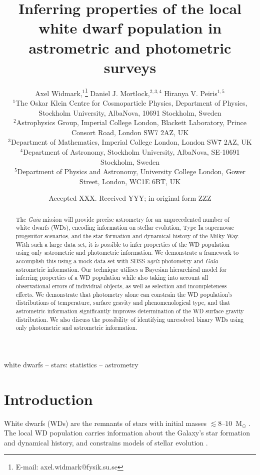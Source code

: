 \documentclass[fleqn,usenatbib]{mnras}
\title[Inferring properties of the white dwarf population]{Inferring properties of the local white dwarf population in astrometric and photometric surveys}
\author[A. Widmark et al.]{
Axel Widmark,$^1$\thanks{E-mail: axel.widmark@fysik.su.se} 
Daniel J. Mortlock,$^{2,3,4}$
Hiranya V. Peiris$^{1,5}$
\\
$^1$The Oskar Klein Centre for Cosmoparticle Physics, Department of
Physics, Stockholm University, AlbaNova, 10691 Stockholm, Sweden\\
$^2$Astrophysics Group, Imperial College London, Blackett Laboratory, Prince Consort Road, London SW7 2AZ, UK\\
$^3$Department of Mathematics, Imperial College London, London SW7 2AZ, UK\\
$^4$Department of Astronomy, Stockholm University, AlbaNova, SE-10691 Stockholm, Sweden\\
$^5$Department of Physics and Astronomy, University College London, Gower Street, London, WC1E 6BT, UK\\
}
\date{Accepted XXX. Received YYY; in original form ZZZ}
\begin{document}
\label{firstpage}
\pagerange{\pageref{firstpage}--\pageref{lastpage}}
\maketitle

\begin{abstract}
The \emph{Gaia} mission will provide precise astrometry for an unprecedented number of white dwarfs (WDs), encoding information on stellar evolution, Type Ia supernovae progenitor scenarios, and the star formation and dynamical history of the Milky Way. With such a large data set, it is possible to infer properties of the WD population using only astrometric and photometric information. We demonstrate a framework to accomplish this using a mock data set with SDSS \emph{ugriz} photometry and \emph{Gaia} astrometric information.
Our technique utilises a Bayesian hierarchical model for inferring properties of a WD population while also taking into account all observational errors of individual objects, as well as selection and incompleteness effects.
We demonstrate that photometry alone can constrain the WD population's  distributions of temperature, surface gravity and phenomenological type, and that astrometric information significantly improves determination of the WD surface gravity distribution. We also discuss the possibility of identifying unresolved binary WDs using only photometric and astrometric information.
\end{abstract}

\begin{keywords}
white dwarfs -- stars: statistics -- astrometry
\end{keywords}









\section{Introduction}

White dwarfs (WDs) are the remnants of stars with initial masses $\lesssim8\mbox{--}10$~M$_\odot$ \citep{1996ApJ...460..489R,2009MNRAS.395.1409S}. The local WD population carries information about the Galaxy's star formation and dynamical history, and constrains models of stellar evolution \citep{1987ApJ...315L..77W,2016NewAR..72....1G,2018arXiv180505849E}.
\end{document}
